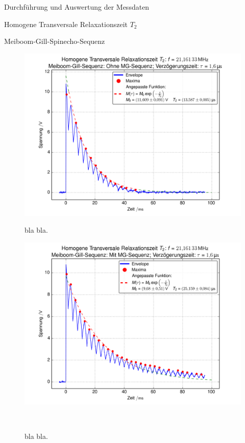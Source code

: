 \documentclass[pdftex, a4paper,11pt, twoside, ngerman]{report}
\begin{document}
\begin{chapter}{Durchführung und Auswertung der Messdaten}
\begin{section}{
        Homogene Transversale Relaxationszeit $T_{2}$}
\begin{subsection}{Meiboom-Gill-Spinecho-Sequenz}
        
        \begin{figure}[htb]
          \centering
          \begin{minipage}{.48\textwidth}
            \centering
            \includegraphics[width=\textwidth]
            {Figures/HomoTransRelax_MG_env0.png}
            \caption{bla bla.}
            \label{figMG_env0}
          \end{minipage}\quad
          \begin{minipage}{.48\textwidth}
            \centering
            \includegraphics[width=\textwidth]
            {Figures/HomoTransRelax_MG_env1.png}
            \caption{bla bla.}
            \label{figMG_env1}
          \end{minipage}\\

\end{figure}
\end{subsection}
\end{section}
\end{chapter}
\end{document}
